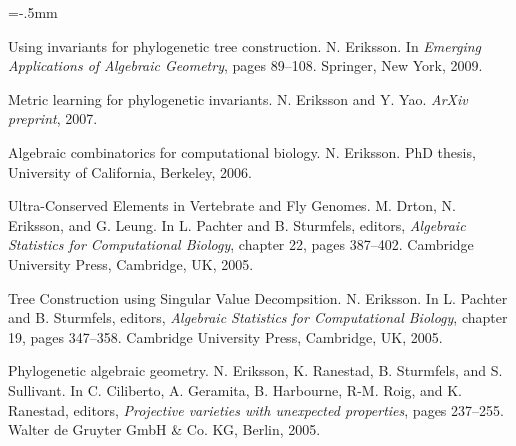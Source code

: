 \documentclass[11pt]{article}
\newenvironment{papers}[1][1]
	{\vspace{-2ex}\leftmargini=16.1mm%
	 \begin{revnumerate}[{#1}]\itemsep=-.5mm}
	{\end{revnumerate}\vspace{-2ex}}
\def\paper{\item}
\def\paperyear#1{\item[\addtocounter{enumi}{-1}%
		 {\makebox[0mm][r]{\makebox[14mm]{#1\hfill\arabic{enumi}.}}}]}
\begin{document}
\begin{papers}[6]%

 
            \paperyear{2009}
        Using invariants for phylogenetic tree construction.
        N. Eriksson.
        In \textit{Emerging Applications of Algebraic Geometry}, pages 89--108. Springer, New York, 2009.
     
            \paperyear{2007}
        Metric learning for phylogenetic invariants.
        N. Eriksson and Y. Yao.
        \textit{ArXiv preprint}, 2007.
     
            \paperyear{2006}
        Algebraic combinatorics for computational biology.
        N. Eriksson.
        PhD thesis, University of California, Berkeley, 2006.
     
            \paperyear{2005}
        Ultra-Conserved Elements in Vertebrate and Fly Genomes.
        M. Drton, N. Eriksson, and G. Leung.
        In L. Pachter and B. Sturmfels, editors, \textit{Algebraic Statistics for Computational Biology}, chapter 22, pages 387--402. Cambridge University Press, Cambridge, UK, 2005.
            \paper
        Tree Construction using Singular Value Decompsition.
        N. Eriksson.
        In L. Pachter and B. Sturmfels, editors, \textit{Algebraic Statistics for Computational Biology}, chapter 19, pages 347--358. Cambridge University Press, Cambridge, UK, 2005.
            \paper
        Phylogenetic algebraic geometry.
        N. Eriksson,  K. Ranestad, B. Sturmfels, and S. Sullivant.
        In C. Ciliberto, A. Geramita, B. Harbourne, R-M. Roig, and K. Ranestad, editors, \textit{Projective varieties with unexpected properties}, pages 237--255. Walter de Gruyter GmbH \& Co. KG, Berlin, 2005.
    \end{papers}
\end{document}

